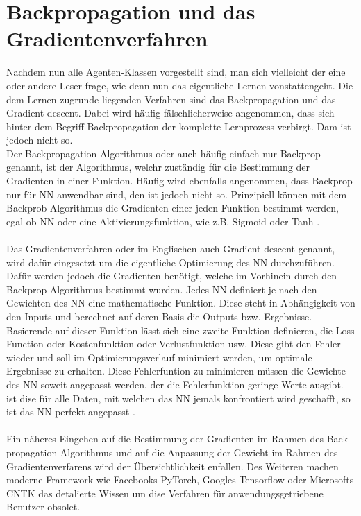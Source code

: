 \section{Backpropagation und das Gradientenverfahren}
Nachdem nun alle Agenten-Klassen vorgestellt sind, man sich vielleicht der eine oder andere Leser frage, wie denn nun das eigentliche Lernen vonstattengeht. Die dem Lernen zugrunde liegenden Verfahren sind das Backpropagation und das Gradient descent. Dabei wird häufig fälschlicherweise angenommen, dass sich hinter dem Begriff Backpropagation  der komplette Lernprozess verbirgt. Dam ist jedoch nicht so.\\
Der Backpropagation-Algorithmus oder auch häufig einfach nur Backprop genannt, ist der Algorithmus, welchr zuständig für die Bestimmung der Gradienten in einer Funktion. Häufig wird ebenfalls angenommen, dass Backprop nur für NN anwendbar sind, den ist jedoch nicht so. Prinzipiell können mit dem Backprob-Algorithmus die Gradienten einer jeden Funktion bestimmt werden, egal ob NN oder eine Aktivierungsfunktion, wie z.B. Sigmoid oder Tanh \cite[S. 90ff.]{DL}.\\
\\Das Gradientenverfahren oder im Englischen auch Gradient descent genannt, wird dafür eingesetzt um die eigentliche Optimierung des NN durchzuführen. Dafür werden jedoch die Gradienten benötigt, welche im Vorhinein durch den Backprop-Algorithmus bestimmt wurden. Jedes NN definiert je nach den Gewichten des NN eine mathematische Funktion. Diese steht in Abhängigkeit von den Inputs und berechnet auf deren Basis die Outputs bzw. Ergebnisse. Basierende auf dieser Funktion lässt sich eine zweite Funktion definieren, die Loss Function oder Kostenfunktion oder Verlustfunktion usw. Diese gibt den Fehler wieder und soll im Optimierungsverlauf minimiert werden, um optimale Ergebnisse zu erhalten. Diese Fehlerfuntion zu minimieren müssen die Gewichte des NN soweit angepasst werden, der die Fehlerfunktion geringe Werte ausgibt. ist dise für alle Daten, mit welchen das NN jemals konfrontiert wird geschafft, so ist das NN perfekt angepasst \cite[S. 225ff.]{DL}.\\
\\Ein näheres Eingehen auf die Bestimmung der Gradienten im Rahmen des Back-propagation-Algorithmus und auf die Anpassung der Gewicht im Rahmen des Gradientenverfarens wird der Übersichtlichkeit enfallen. Des Weiteren machen moderne Framework wie Facebooks PyTorch, Googles Tensorflow oder Microsofts CNTK das detalierte Wissen um dise Verfahren für anwendungsgetriebene Benutzer obsolet.